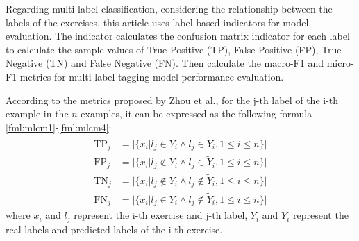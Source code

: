 
Regarding multi-label classification, considering the relationship between the labels of the exercises, this article uses label-based indicators for model evaluation. The indicator calculates the confusion matrix indicator for each label to calculate the sample values of True Positive (TP), False Positive (FP), True Negative (TN) and False Negative (FN). Then calculate the macro-F1 and micro-F1 metrics for multi-label tagging model performance evaluation.

According to the metrics proposed by Zhou et al.\cite{zhang2013review}, for the j-th label of the i-th example in the $n$ examples, it can be expressed as the following formula \ref{fml:mlcm1}-\ref{fml:mlcm4}:
\begin{align}
	\operatorname{TP}_j & =| \{x_i| l_j\in Y_{i}\wedge l_j \in \tilde{Y}_i , 1\leq i \leq n\}| \label{fml:mlcm1}       \\
	\operatorname{FP}_j & =| \{x_i| l_j\notin Y_{i}\wedge l_j \in \tilde{Y}_i , 1\leq i \leq n\}| \label{fml:mlcm2}    \\
	\operatorname{TN}_j & =| \{x_i| l_j\notin Y_{i}\wedge l_j \notin \tilde{Y}_i , 1\leq i \leq n\}| \label{fml:mlcm3} \\
	\operatorname{FN}_j & =| \{x_i| l_j\in Y_{i}\wedge l_j \notin \tilde{Y}_i , 1\leq i \leq n\}| \label{fml:mlcm4}
\end{align}
where \(x_i\) and \(l_j\) represent the i-th exercise and j-th label, \(Y_i\) and \(\tilde{Y}_i\) represent the real labels and predicted labels of the i-th exercise.


